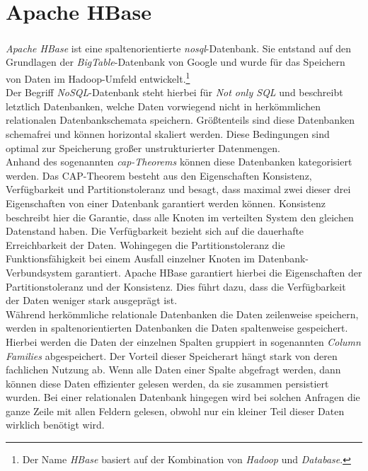 \section{Apache HBase}
\label{sec:theory_hbase}
\textit{Apache HBase\textsuperscript{\textregistered}} ist eine spaltenorientierte \textit{\acrshort{nosql}}-Datenbank. Sie entstand auf den Grundlagen der \textit{BigTable}-Datenbank von Google und wurde für das Speichern von Daten im Hadoop-Umfeld entwickelt.\footnote{Der Name \textit{HBase} basiert auf der Kombination von \textit{Hadoop} und \textit{Database}.}\\
Der Begriff \textit{NoSQL}-Datenbank steht hierbei für \textit{Not only SQL} und beschreibt letztlich Datenbanken, welche Daten vorwiegend nicht in herkömmlichen relationalen Datenbankschemata speichern. Größtenteils sind diese Datenbanken schemafrei und können horizontal skaliert werden. Diese Bedingungen sind optimal zur Speicherung großer unstrukturierter Datenmengen.\\
Anhand des sogenannten \textit{\acrshort{cap}-Theorems} können diese Datenbanken kategorisiert werden.
Das CAP-Theorem besteht aus den Eigenschaften Konsistenz, Verfügbarkeit und Partitionstoleranz und besagt, dass maximal zwei dieser drei Eigenschaften von einer Datenbank garantiert werden können. Konsistenz beschreibt hier die Garantie, dass alle Knoten im verteilten System den gleichen Datenstand haben. Die Verfügbarkeit bezieht sich auf die dauerhafte Erreichbarkeit der Daten. Wohingegen die Partitionstoleranz die Funktionsfähigkeit bei einem Ausfall einzelner Knoten im Datenbank-Verbundsystem garantiert.
Apache HBase garantiert hierbei die Eigenschaften der Partitionstoleranz und der Konsistenz. Dies führt dazu, dass die Verfügbarkeit der Daten weniger stark ausgeprägt ist.
\cite[S. 189 ff.]{big_data_praxis}\\

\noindent
Während herkömmliche relationale Datenbanken die Daten zeilenweise speichern, werden in spaltenorientierten Datenbanken die Daten spaltenweise gespeichert. Hierbei werden die Daten der einzelnen Spalten gruppiert in sogenannten \textit{Column Families} abgespeichert. Der Vorteil dieser Speicherart hängt stark von deren fachlichen Nutzung ab. Wenn alle Daten einer Spalte abgefragt werden, dann können diese Daten effizienter gelesen werden, da sie zusammen persistiert wurden. Bei einer relationalen Datenbank hingegen wird bei solchen Anfragen die ganze Zeile mit allen Feldern gelesen, obwohl nur ein kleiner Teil dieser Daten wirklich benötigt wird.\\

